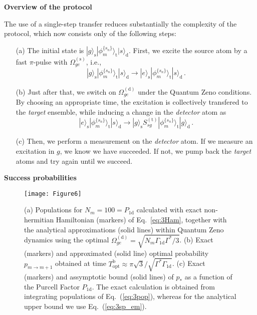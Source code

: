 \documentclass[twocolumn,pra,aps,superscriptaddress,showpacs]{revtex4-1}
\newcommand{\ket}[1]{|#1\rangle}
\def\oned{\mathrm{1d}}
\newcommand{\src}{\mathrm{(s)}}
\newcommand{\trg}{\mathrm{(t)}}
\newcommand{\dtc}{\mathrm{(d)}}
\newcommand{\rs}{\mathrm{s}}
\newcommand{\rd}{\mathrm{d}}
\newcommand{\rt}{\mathrm{t}}
\newcommand{\bb}{\mathrm{b}}
\begin{document}
\textbf{Overview of the protocol}

The use of a single-step transfer reduces substantially the complexity of the protocol, which now consists only of the following steps:
%
\begin{itemize}
	 \item [(a)] The initial state is $\ket{g}_\rs \ket{\phi_m^{ \{ s_n \}}}_\rt \ket{s}_\rd$. First, we excite the source atom by a fast $\pi$-pulse with $\Omega^\src_{ge}$, i.e.,
	 \begin{equation}
	  \ket{g}_\rs \ket{\phi_m^{ \{ s_n \}}}_\rt \ket{s}_\rd
	  \rightarrow 
	  \ket{e}_\rs \ket{\phi_m^{ \{ s_n \}}}_\rt \ket{s}_\rd\,.
	 \end{equation}
	
	 \item [(b)] Just after that, we switch on $\Omega_{ge}^\dtc$ under the Quantum Zeno conditions. By choosing an appropriate time, the excitation is collectively transfered to the \emph{target} ensemble, while inducing a change in the \emph{detector} atom as
	 \begin{equation}
	  \ket{e}_\rs \ket{\phi_m^{ \{ s_n \}}}_\rt \ket{s}_\rd
	  \rightarrow 
	  \ket{g}_\rs S_{sg}^\trg \ket{\phi_m^{ \{ s_n \}}}_\rt \ket{g}_\rd\,.
	 \end{equation}
	 
	 \item [(c)] Then, we perform a measurement on the \emph{detector} atom. If we measure an excitation in $g$, we know we have succeeded. If not, we pump back the \emph{target} atoms and try again until we succeed.
	\end{itemize}
	 
\textbf{Success probabilities}

\begin{figure*}[tb]
	\centering
	\texttt{[image: Figure6]}
	\caption{
		(a) Populations for $N_m=100=P_\oned$ calculated with exact non-hermitian Hamiltonian (markers) of Eq.~\ref{eq:3Ham}, together with the analytical approximations (solid lines) within Quantum Zeno dynamics using the optimal $\Omega_{ge}^\dtc = \sqrt{N_m\Gamma_\oned\Gamma^*/3}$. 
		(b) Exact (markers) and approximated (solid line) optimal probability $p_{m \rightarrow m+1}$ obtained at time $T_\mathrm{opt}^\bb \approx \pi\sqrt{3}/\sqrt{\Gamma^*\Gamma_\oned}$. 
		(c) Exact (markers) and assymptotic bound (solid lines) of $p_{*}$ as a function of the Purcell Factor $P_\oned$. The exact calculation is obtained from integrating populations of Eq.~(\ref{eq:3pop}), whereas for the analytical upper bound we use Eq.~(\ref{eq:3sp_em}).
		}
	\label{fig:prot3}
\end{figure*} 
\end{document}
